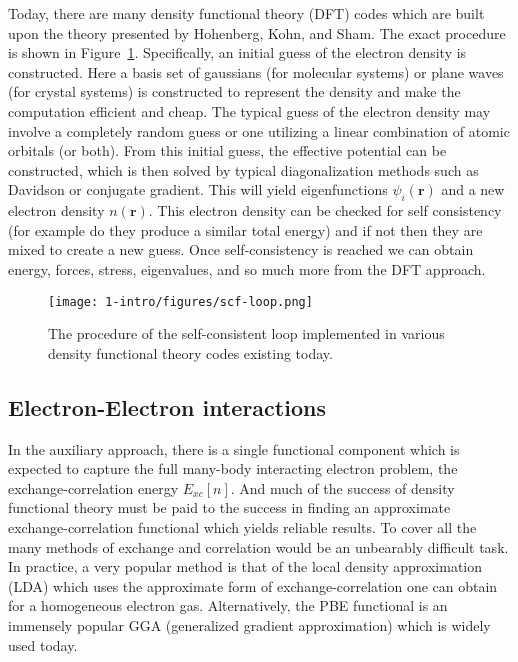 Today, there are many density functional theory (DFT) codes which are built upon the theory presented by Hohenberg, Kohn, and Sham. The exact procedure is shown in Figure~\ref{intro:fig:scf}. Specifically, an initial guess of the electron density is constructed. Here a basis set of gaussians (for molecular systems) or plane waves (for crystal systems) is constructed to represent the density and make the computation efficient and cheap. The typical guess of the electron density may involve a completely random guess or one utilizing a linear combination of atomic orbitals (or both). From this initial guess, the effective potential can be constructed, which is then solved by typical diagonalization methods such as Davidson or conjugate gradient. This will yield eigenfunctions $\psi_i(\textbf{r})$ and a new electron density $n(\textbf{r})$. This electron density can be checked for self consistency (for example do they produce a similar total energy) and if not then they are mixed to create a new guess. Once self-consistency is reached we can obtain energy, forces, stress, eigenvalues, and so much more from the DFT approach.

\begin{figure}[h]
\begin{center}
\texttt{[image: 1-intro/figures/scf-loop.png]}
    \caption{The procedure of the self-consistent loop implemented in various density functional theory codes existing today.}  \label{intro:fig:scf}
\end{center}
\end{figure}


\subsection{Electron-Electron interactions}

In the auxiliary approach, there is a single functional component which is expected to capture the full many-body interacting electron problem, the exchange-correlation energy $E_{xc}[n]$. And much of the success of density functional theory must be paid to the success in finding an approximate exchange-correlation functional which yields reliable results.
To cover all the many methods of exchange and correlation would be an unbearably difficult task. In practice, a very popular method is that of the local density approximation (LDA) which uses the approximate form of exchange-correlation one can obtain for a homogeneous electron gas. Alternatively, the PBE functional is an immensely popular GGA (generalized gradient approximation) which is widely used today.~\cite{perdew1996generalized}

